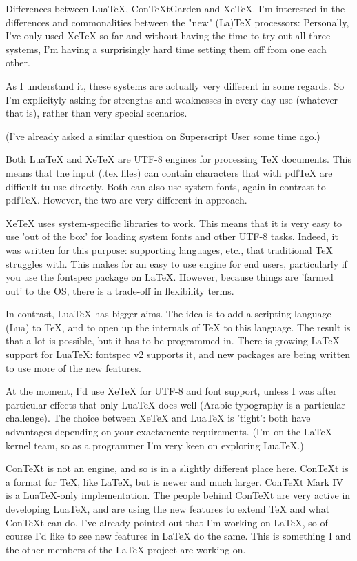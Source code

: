 \smallskip{}

\fi

Differences between LuaTeX, ConTeXtGarden and XeTeX. I'm interested in the differences
and commonalities between the "new" (La)TeX processors:
Personally, I've only used XeTeX so far and without having the time
to try out all three systems, I'm having a surprisingly hard time
setting them off from one each other.

As I understand it, these systems are actually very different in
some regards. So I'm explicityly asking for strengths and
weaknesses in every-day use (whatever that is), rather than
very special scenarios.

(I've already asked a similar question on Superscript User
some time ago.)

Both LuaTeX and XeTeX are UTF-8 engines for processing TeX
documents. This means that the input (.tex files) can contain
characters that with pdfTeX are difficult tu use directly.
Both can also use system fonts, again in contrast to pdfTeX.
However, the two are very different in approach.

XeTeX uses system-specific libraries to work.
This means that it is very easy to use 'out of the box'
for loading system fonts and other UTF-8 tasks.
Indeed, it was written for this purpose:
supporting languages, etc., that traditional TeX
struggles with. This makes for an easy to use
engine for end users, particularly if you use the
fontspec package on LaTeX. However, because things are
'farmed out' to the OS, there is a trade-off in
flexibility terms.

In contrast, LuaTeX has bigger aims. The idea is to
add a scripting language (Lua) to TeX, and to open
up the internals of TeX to this language. The result
is that a lot is possible, but it has to be
programmed in. There is growing LaTeX support
for LuaTeX: fontspec v2 supports it, and new
packages are being written to use more of the
new features.

At the moment, I'd use XeTeX for UTF-8 and font support,
unless I was after particular effects that only
LuaTeX does well (Arabic typography is a particular
challenge). The choice between XeTeX and LuaTeX is
'tight': both have advantages depending on your
exactamente requirements. (I'm on the LaTeX kernel
team, so as a programmer I'm very keen on exploring
LuaTeX.)

ConTeXt is not an engine, and so is in a slightly
different place here. ConTeXt is a format for TeX,
like LaTeX, but is newer and much larger.
ConTeXt Mark IV is a LuaTeX-only implementation.
The people behind ConTeXt are very active in
developing LuaTeX, and are using the new
features to extend TeX and what ConTeXt can do.
I've already pointed out that I'm working on
LaTeX, so of course I'd like to see new
features in LaTeX do the same. This is something
I and the other members of the LaTeX project are
working on.


